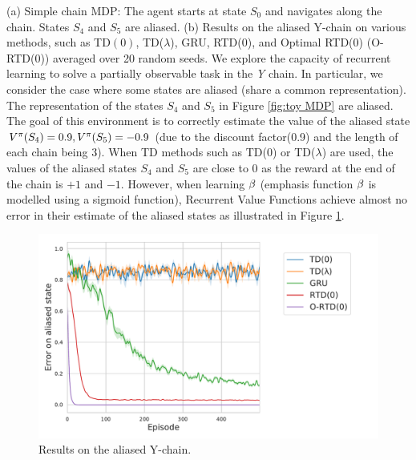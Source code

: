 (a) Simple chain MDP: The agent starts at state $S_0$ and navigates along the chain. States $S_4$ and $S_5$ are aliased. (b) Results on the aliased Y-chain on various methods, such as TD$(0)$, TD($\lambda$), GRU, RTD($0$), and Optimal RTD($0$) (O-RTD(0)) averaged over 20 random seeds.
We explore the capacity of recurrent learning to solve a partially observable task in the \emph{Y} chain. In particular, we consider the case where some states are aliased (share a common representation). The representation of the states $S_4$ and $S_5$ in Figure \ref{fig:toy MDP} are aliased. The goal of this environment is to correctly estimate the value of the aliased state $V^{\pi}(S_4)=0.9,V^{\pi}(S_5)=-0.9$ (due to the discount factor(0.9) and the length of each chain being 3). When TD methods such as TD($0$) or TD($\lambda$) are used, the values of the aliased states $S_4$ and $S_5$ are close to $0$ as the reward at the end of the chain is $+1$ and $-1$.  However, when learning $\beta$ (emphasis function $\beta$ is modelled using a sigmoid function), Recurrent Value Functions achieve almost no error in their estimate of the aliased states as illustrated in Figure \ref{fig:pomdp}.
\begin{figure}[h]
    \centering
    \includegraphics[scale=0.6]{fig/POMDP.pdf}
    \caption[Y-chain performance]{Results on the aliased Y-chain.}
    \label{fig:pomdp}
\end{figure}

